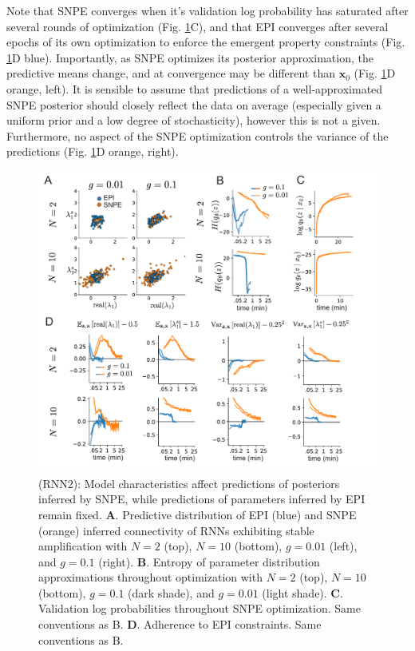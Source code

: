 \documentclass[11pt]{article}
\begin{document}
Note that SNPE converges when it's validation log probability has saturated after several rounds of optimization (Fig. \ref{fig:RNN2}C), and that EPI converges after several epochs of its own optimization to enforce the emergent property constraints (Fig. \ref{fig:RNN2}D blue).
Importantly, as SNPE optimizes its posterior approximation, the predictive means change, and at convergence may be different than $\mathbf{x}_0$ (Fig. \ref{fig:RNN2}D orange, left).
It is sensible to assume that predictions of a well-approximated SNPE posterior should closely reflect the data on average (especially given a uniform prior and a low degree of stochasticity), however this is not a given.
Furthermore, no aspect of the SNPE optimization controls the variance of the predictions (Fig. \ref{fig:RNN2}D orange, right).

\begin{figure}
\begin{center}
\includegraphics[scale=0.8]{figures/figRNN2/figRNN2.pdf}
\end{center}
\caption{\small (RNN2): Model characteristics affect predictions of posteriors inferred by SNPE, while predictions of parameters inferred by EPI remain fixed.
\textbf{A}. Predictive distribution of EPI (blue) and SNPE (orange) inferred connectivity of RNNs exhibiting stable amplification with $N=2$ (top), $N=10$ (bottom), $g=0.01$ (left), and $g=0.1$ (right).
\textbf{B}. Entropy of parameter distribution approximations throughout optimization with $N=2$ (top), $N=10$ (bottom), $g=0.1$ (dark shade), and $g=0.01$ (light shade).
\textbf{C}. Validation log probabilities throughout SNPE optimization. Same conventions as B.
\textbf{D}. Adherence to EPI constraints. Same conventions as B.
}
\label{fig:RNN2}
\end{figure}
\end{document}
